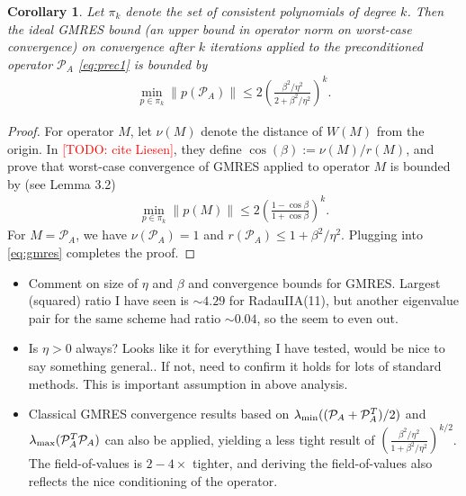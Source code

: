 \documentclass[a4paper,10pt]{article}
\makeatletter
\newtheorem{corollary}{Corollary}
\newcommand{\todo}[1]{\textcolor{red}{[TODO\@: #1]}}
\makeatother
\begin{document}
%
\begin{corollary}\label{cor:gmres}
Let $\pi_k$ denote the set of consistent polynomials of degree $k$. Then the ideal GMRES bound
(an upper bound in operator norm on worst-case convergence) on convergence after $k$ iterations
applied to the preconditioned operator $\mathcal{P}_A$ \eqref{eq:prec1} is bounded by
\begin{align*}
\min_{p\in\pi_k} \|p(\mathcal{P}_A)\| \leq 2\left(\frac{\beta^2/\eta^2}{2 + \beta^2/\eta^2}\right)^k.
\end{align*}
\end{corollary}
\begin{proof}
For operator $M$, let $\nu(M)$ denote the distance of $W(M)$ from the origin. In \todo{cite Liesen},
they define $\cos(\beta) := \nu(M) / r(M)$, and prove that worst-case convergence of GMRES applied
to operator $M$ is bounded by (see Lemma 3.2)
%
\begin{align}\label{eq:gmres}
\min_{p\in\pi_k} \|p(M)\| \leq 2\left(\frac{1-\cos\beta}{1+\cos\beta}\right)^k.
\end{align}
%
For $M = \mathcal{P}_A$, we have $\nu(\mathcal{P}_A)= 1$ and $r(\mathcal{P}_A) \leq 1+\beta^2/\eta^2$.
Plugging into \eqref{eq:gmres} completes the proof. 
\end{proof}
%

{\color{blue}
\begin{itemize}
	\item Comment on size of $\eta$ and $\beta$ and convergence bounds for GMRES. Largest (squared)
	ratio I have seen is $\sim 4.29$ for RadauIIA(11), but another eigenvalue pair for the same
	scheme had ratio $\sim 0.04$, so the seem to even out.

	\item Is $\eta > 0$ always? Looks like it for everything I have tested, would be nice to
	say something general.. If not, need to confirm it holds for lots of standard methods.
	This is important assumption in above analysis.

	\item Classical GMRES convergence results based on $\lambda_{\textnormal{min}}((\mathcal{P}_A+
	\mathcal{P}_A^T)/2)$ and $\lambda_{\textnormal{max}}(\mathcal{P}_A^T\mathcal{P}_A)$ can also
	be applied, yielding a less tight result of $\left(\frac{\beta^2/\eta^2}{1 + \beta^2/\eta^2}\right)^{k/2}$.
	The field-of-values is $2-4\times$ tighter, and deriving the field-of-values also reflects the
	nice conditioning of the operator. 

\end{itemize}
}
\end{document}

